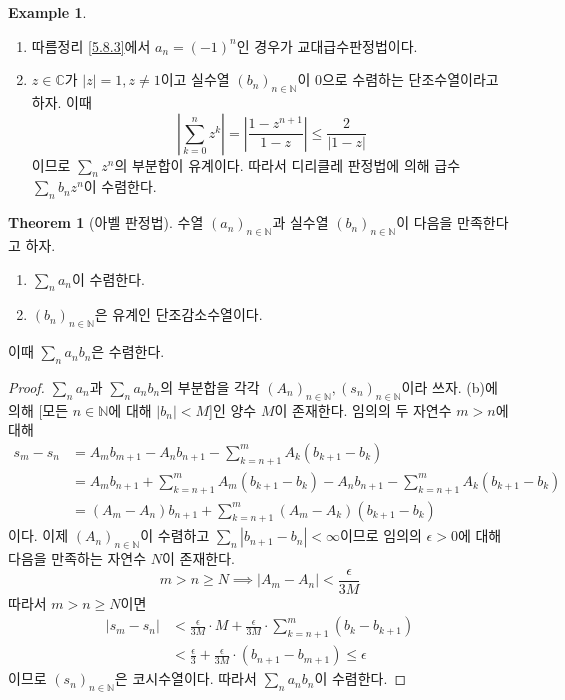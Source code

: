\documentclass[11pt]{book}
\numberwithin{equation}{chapter}
\def\NN{\mathbb{N}}
\def\CC{\mathbb{C}}
\def\eps{\epsilon}
\newcommand{\abs}[1]{\left\vert#1\right\vert}
\theoremstyle{definition}
\newtheorem{thm}{Theorem}[section]
\newtheorem*{ex}{Example}
\newenvironment{enum}
	{\begin{enumerate}[label=(\alph*), leftmargin=2\parindent]}
	{\end{enumerate}}
\begin{document}
\begin{ex}
    \quad

    \begin{enum}
        \item 따름정리 \ref{5.8.3}에서 \(a_n = (-1)^n\)인 경우가 교대급수판정법이다.
        \item \(z \in \CC\)가 \(\abs{z} = 1, z \ne 1\)이고 실수열 \((b_n)_{n \in \NN}\)이 0으로 수렴하는 단조수열이라고 하자. 이때
        \[
            \abs{\sum_{k=0}^n z^k} = \abs{\frac{1 - z^{n+1}}{1 - z}} \le \frac{2}{\abs{1 - z}}
        \]
        이므로 \(\sum_n z^n\)의 부분합이 유계이다. 따라서 디리클레 판정법에 의해 급수 \(\sum_n b_n z^n\)이 수렴한다.
    \end{enum}
\end{ex}

\begin{thm}[아벨 판정법] 
    수열 \((a_n)_{n \in \NN}\)과 실수열 \((b_n)_{n \in \NN}\)이 다음을 만족한다고 하자.
    \begin{enum}
        \item \(\sum_n a_n\)이 수렴한다. 
        \item \((b_n)_{n \in \NN}\)은 유계인 단조감소수열이다.
    \end{enum}
    이때 \(\sum_n a_n b_n\)은 수렴한다.
\end{thm}
\begin{proof}
    \(\sum_n a_n\)과 \(\sum_n a_n b_n\)의 부분합을 각각 \((A_n)_{n \in \NN}, (s_n)_{n \in \NN}\)이라 쓰자. (b)에 의해 [모든 \(n \in \NN\)에 대해 \(\abs{b_n} < M\)]인 양수 \(M\)이 존재한다. 임의의 두 자연수 \(m > n\)에 대해
    \begin{align*}
        s_m - s_n &= A_m b_{m+1} - A_n b_{n+1} - \sum_{k=n+1}^m A_k (b_{k+1} - b_k)\\
        &= A_m b_{n+1} + \sum_{k=n+1}^m A_m (b_{k+1} - b_k) - A_n b_{n+1} - \sum_{k=n+1}^m A_k (b_{k+1} - b_k)\\
        &= (A_m - A_n) b_{n+1} + \sum_{k=n+1}^m (A_m - A_k)(b_{k+1}- b_k)
    \end{align*}
    이다. 이제 \((A_n)_{n \in \NN}\)이 수렴하고 \(\sum_n \abs{b_{n+1} - b_n} < \infty\)이므로 임의의 \(\eps > 0\)에 대해 다음을 만족하는 자연수 \(N\)이 존재한다.
    \[
    m > n \ge N \implies \abs{A_m - A_n} < \frac{\eps}{3M}
    \]
    따라서 \(m > n \ge N\)이면
    \begin{align*}
        \abs{s_m - s_n} &< \frac{\eps}{3M} \cdot M + \frac{\eps}{3M} \cdot \sum_{k=n+1}^m (b_k - b_{k+1})\\
        &< \frac{\eps}{3} + \frac{\eps}{3M} \cdot (b_{n+1} - b_{m+1}) \le \eps
    \end{align*}
    이므로 \((s_n)_{n \in \NN}\)은 코시수열이다. 따라서 \(\sum_n a_n b_n\)이 수렴한다.
\end{proof}
\end{document}
